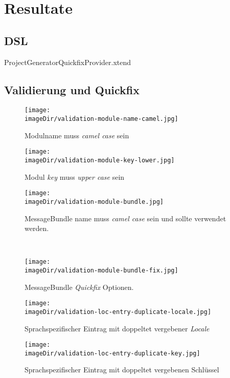 \section{Resultate}
\subsection{DSL}
\begin{code}
	\caption{ProjectGeneratorQuickfixProvider.xtend}
	\label{src:module-dsl}
\end{code}

\subsection{Validierung und Quickfix}
\begin{figure}[h]
	\centering
	\texttt{[image: \\imageDir/validation-module-name-camel.jpg]}
	\caption{Modulname muss \emph{camel case} sein}
	\label{fig:validation-1}
\end{figure}

\begin{figure}[h]
\centering
\texttt{[image: \\imageDir/validation-module-key-lower.jpg]}
\caption{Modul \emph{key} muss \emph{upper case} sein}
\label{fig:validation-2}
\end{figure}

\begin{figure}[h]
\centering
\texttt{[image: \\imageDir/validation-module-bundle.jpg]}
\caption{MessageBundle name muss \emph{camel case} sein und sollte verwendet werden.}
\label{fig:validation-3}
\end{figure}
\ \newpage

\begin{figure}[h]
\centering
\texttt{[image: \\imageDir/validation-module-bundle-fix.jpg]}
\caption{MessageBundle \emph{Quickfix} Optionen.}
\label{fig:validation-4}
\end{figure}

\begin{figure}[h]
\centering
\texttt{[image: \\imageDir/validation-loc-entry-duplicate-locale.jpg]}
\caption{Sprachspezifischer Eintrag mit doppeltet vergebener \emph{Locale}}
\label{fig:validation-5}
\end{figure}

\begin{figure}[h]
\centering
\texttt{[image: \\imageDir/validation-loc-entry-duplicate-key.jpg]}
\caption{Sprachspezifischer Eintrag mit doppeltet vergebenen Schlüssel}
\label{fig:validation-6}
\end{figure}
\newpage

